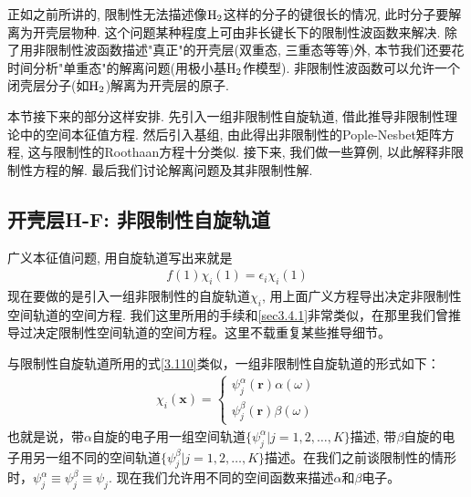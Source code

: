 正如之前所讲的, 限制性\hft  无法描述像$\mathrm{H}_2$这样的分子的键很长的情况, 此时分子要解离为开壳层物种. 这个问题某种程度上可由非长键长下的限制性波函数来解决. 除了用非限制性波函数描述"真正"的开壳层(双重态, 三重态等等)外, 本节我们还要花时间分析"单重态"的解离问题(用极小基$\mathrm{H}_2$作模型). 非限制性波函数可以允许一个闭壳层分子(如$\mathrm{H}_2$)解离为开壳层的原子.

本节接下来的部分这样安排. 先引入一组非限制性自旋轨道, 借此推导非限制性\hft 理论中的空间本征值方程. 然后引入基组, 由此得出非限制性的Pople-Nesbet矩阵方程, 这与限制性的Roothaan方程十分类似. 接下来, 我们做一些算例, 以此解释非限制性方程的解. 最后我们讨论解离问题及其非限制性解.
\subsection{开壳层H-F: 非限制性自旋轨道}
广义\hft 本征值问题, 用自旋轨道写出来就是
\begin{align}
f(1)\chi_i(1) = \epsilon_i \chi_i(1)
\end{align}
现在要做的是引入一组非限制性的自旋轨道$\chi_i$, 用上面广义\hft 方程导出决定非限制性空间轨道的空间方程. 我们这里所用的手续和\ref{sec3.4.1}非常类似，在那里我们曾推导过决定限制性空间轨道的空间方程。这里不载重复某些推导细节。

与限制性自旋轨道所用的式\eqref{3.110}类似，一组非限制性自旋轨道的形式如下：
\begin{align}
\chi_i(\mathbf{x}) =
\begin{cases*}
\psi_j^\alpha(\mathbf{r})\alpha(\omega)\\
\psi_j^\beta (\mathbf{r})\beta(\omega)
\end{cases*}
\end{align}
也就是说，带$\alpha$自旋的电子用一组空间轨道$\{\psi_j^\alpha |j=1,2,\ldots,K \}$描述, 带$\beta$自旋的电子用另一组不同的空间轨道$\{\psi_j^\beta |j=1,2,\ldots,K \}$描述。在我们之前谈限制性的情形时，$\psi_j^\alpha \equiv \psi_j^\beta \equiv \psi_j$. 现在我们允许用不同的空间函数来描述$\alpha$和$\beta$电子。

